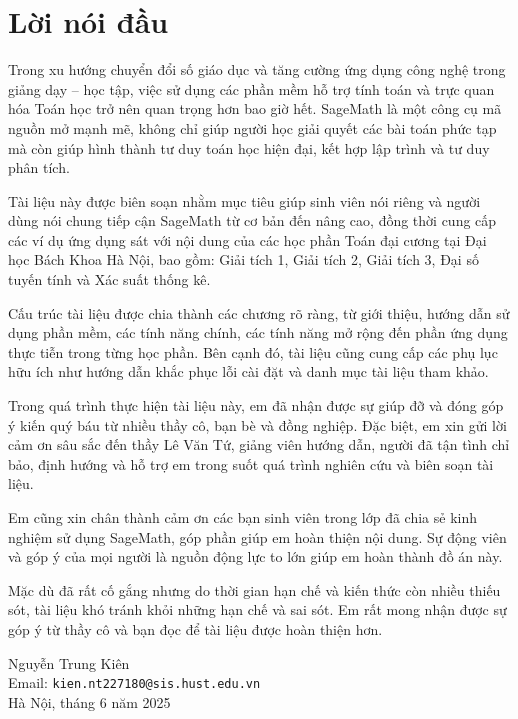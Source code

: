 \chapter*{Lời nói đầu}

Trong xu hướng chuyển đổi số giáo dục và tăng cường ứng dụng công nghệ trong giảng dạy – học tập, việc sử dụng các phần mềm hỗ trợ tính toán và trực quan hóa Toán học trở nên quan trọng hơn bao giờ hết. SageMath là một công cụ mã nguồn mở mạnh mẽ, không chỉ giúp người học giải quyết các bài toán phức tạp mà còn giúp hình thành tư duy toán học hiện đại, kết hợp lập trình và tư duy phân tích.

Tài liệu này được biên soạn nhằm mục tiêu giúp sinh viên nói riêng và người dùng nói chung tiếp cận SageMath từ cơ bản đến nâng cao, đồng thời cung cấp các ví dụ ứng dụng sát với nội dung của các học phần Toán đại cương tại Đại học Bách Khoa Hà Nội, bao gồm: Giải tích 1, Giải tích 2, Giải tích 3, Đại số tuyến tính và Xác suất thống kê.

Cấu trúc tài liệu được chia thành các chương rõ ràng, từ giới thiệu, hướng dẫn sử dụng phần mềm, các tính năng chính, các tính năng mở rộng đến phần ứng dụng thực tiễn trong từng học phần. Bên cạnh đó, tài liệu cũng cung cấp các phụ lục hữu ích như hướng dẫn khắc phục lỗi cài đặt và danh mục tài liệu tham khảo.

\vspace{1em}

Trong quá trình thực hiện tài liệu này, em đã nhận được sự giúp đỡ và đóng góp ý kiến quý báu từ nhiều thầy cô, bạn bè và đồng nghiệp. Đặc biệt, em xin gửi lời cảm ơn sâu sắc đến thầy Lê Văn Tứ, giảng viên hướng dẫn, người đã tận tình chỉ bảo, định hướng và hỗ trợ em trong suốt quá trình nghiên cứu và biên soạn tài liệu. 

Em cũng xin chân thành cảm ơn các bạn sinh viên trong lớp đã chia sẻ kinh nghiệm sử dụng SageMath, góp phần giúp em hoàn thiện nội dung. Sự động viên và góp ý của mọi người là nguồn động lực to lớn giúp em hoàn thành đồ án này.

Mặc dù đã rất cố gắng nhưng do thời gian hạn chế và kiến thức còn nhiều thiếu sót, tài liệu khó tránh khỏi những hạn chế và sai sót. Em rất mong nhận được sự góp ý từ thầy cô và bạn đọc để tài liệu được hoàn thiện hơn.

\vspace{1em}
\begin{flushright}
	Nguyễn Trung Kiên\\
	Email: \texttt{kien.nt227180@sis.hust.edu.vn}\\
	Hà Nội, tháng 6 năm 2025
\end{flushright}
